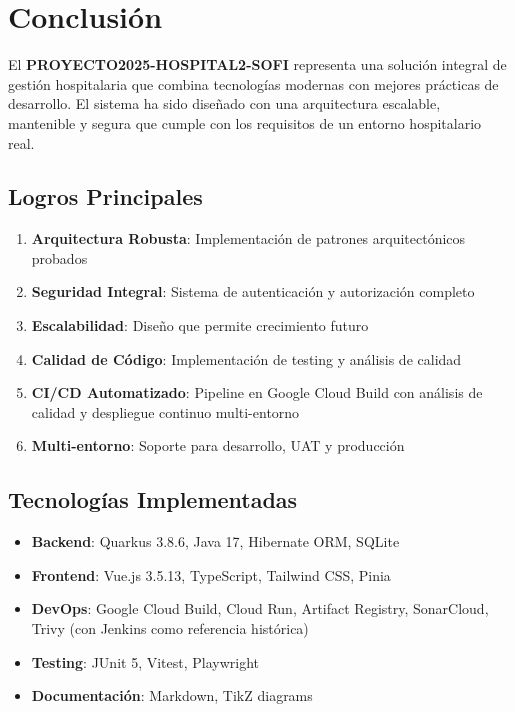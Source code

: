 \documentclass[12pt,a4paper]{article}
\begin{document}
\newpage
\section{Conclusión}

El \textbf{PROYECTO2025-HOSPITAL2-SOFI} representa una solución integral de gestión hospitalaria que combina tecnologías modernas con mejores prácticas de desarrollo. El sistema ha sido diseñado con una arquitectura escalable, mantenible y segura que cumple con los requisitos de un entorno hospitalario real.

\subsection{Logros Principales}

\begin{enumerate}
    \item \textbf{Arquitectura Robusta}: Implementación de patrones arquitectónicos probados
    \item \textbf{Seguridad Integral}: Sistema de autenticación y autorización completo
    \item \textbf{Escalabilidad}: Diseño que permite crecimiento futuro
    \item \textbf{Calidad de Código}: Implementación de testing y análisis de calidad
    \item \textbf{CI/CD Automatizado}: Pipeline en Google Cloud Build con análisis de calidad y despliegue continuo multi-entorno
    \item \textbf{Multi-entorno}: Soporte para desarrollo, UAT y producción
\end{enumerate}

\subsection{Tecnologías Implementadas}

\begin{itemize}
    \item \textbf{Backend}: Quarkus 3.8.6, Java 17, Hibernate ORM, SQLite
    \item \textbf{Frontend}: Vue.js 3.5.13, TypeScript, Tailwind CSS, Pinia
    \item \textbf{DevOps}: Google Cloud Build, Cloud Run, Artifact Registry, SonarCloud, Trivy (con Jenkins como referencia histórica)
    \item \textbf{Testing}: JUnit 5, Vitest, Playwright
    \item \textbf{Documentación}: Markdown, TikZ diagrams
\end{itemize}
\end{document}
